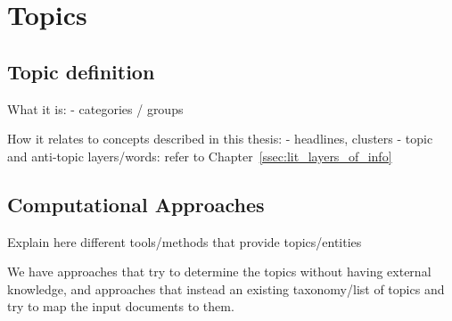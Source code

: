 













\section{\statusred Topics}
\label{sec:lit_topics}

\subsection{Topic definition}
\label{sec:lit_topics_def}

What it is:
- categories / groups 

How it relates to concepts described in this thesis:
- headlines, clusters
- topic and anti-topic layers/words: refer to Chapter~\ref{ssec:lit_layers_of_info}

\subsection{Computational Approaches}
\label{sec:lit_topics_computation}


Explain here different tools/methods that provide topics/entities

We have approaches that try to determine the topics without having external knowledge, and approaches that instead an existing taxonomy/list of topics and try to map the input documents to them.

